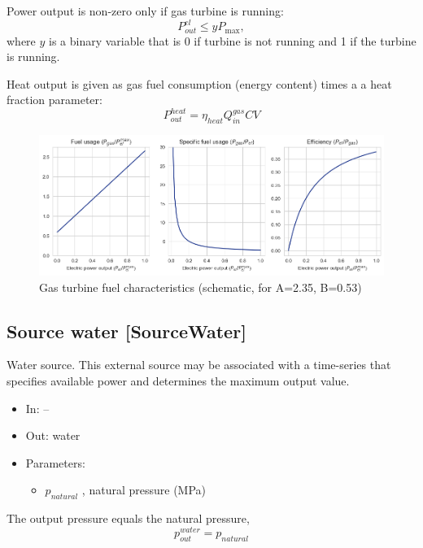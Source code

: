 \documentclass[12pt]{article}
\begin{document}
Power output is non-zero only if gas turbine is running:
\begin{equation}
	 P_{out}^{el} \leq yP_{\max },
\end{equation}
where  $y$ is a binary variable that is 0 if turbine is not running and 1 if the turbine is running.

Heat output is given as gas fuel consumption (energy content) times a a heat fraction parameter:
 \begin{equation}
	P_{out}^{heat}= \eta _{heat}Q_{in}^{gas} CV
\end{equation}

\begin{figure}[]
\centering
		\includegraphics[width=\columnwidth]{./media/gt_fuel_curves.png}
		\caption{Gas turbine fuel characteristics (schematic, for A=2.35, B=0.53)}
		\label{fig:gasturbine_fuel}
\end{figure}



\subsection{Source water [SourceWater]}

Water source. 
This external source may be associated with a time-series that specifies available power and determines the maximum output value.

\begin{itemize}
\item In: --
\item Out: water
\item Parameters: 
\begin{itemize}[noitemsep,topsep=0pt]
	\item $p_{natural}$ , natural pressure (MPa)
\end{itemize}
\end{itemize}

\medskip\noindent
The output pressure equals the natural pressure,
\begin{equation}
	p^{water}_{out} = p_{natural}
\end{equation}
\end{document}
